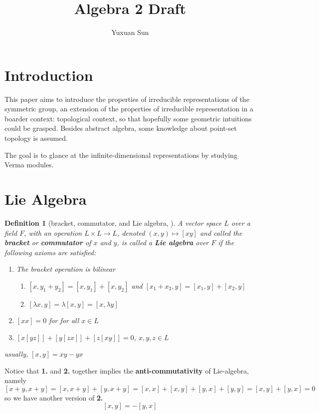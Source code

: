 \documentclass[a4paper]{article}
\title{Algebra 2 Draft}
\author{Yuxuan Sun}
\theoremstyle{theorem} %
\theoremstyle{bfnote}                  %
\newtheorem{defn}[thm]{Definition}
\theoremstyle{example}                       %
\theoremstyle{remark}                       %
\numberwithin{equation}{section}
\begin{document}
\maketitle

\section{Introduction}
This paper aims to introduce the properties of irreducible representations of the symmetric group, an extension of the properties of irreducible representation in a boarder context: topological context, so that hopefully some geometric intuitions could be grasped. Besides abstract algebra, some knowledge about point-set topology is assumed.

The goal is to glance at the infinite-dimensional representations by studying Verma modules.

\section{Lie Algebra}


\begin{defn}[bracket, commutator, and Lie algebra, \citep{Humph}]\label{defn:bracket}
	A vector space $L$ over a field $F$, with an operation $L \times L \to  L$, denoted $(x,y) \mapsto [xy]$ and called the  \textbf{bracket} or \textbf{commutator} of $x$ and  $y$, is called a  \textbf{Lie algebra} over $F$ if the following axioms are satisfied:

	 \begin{enumerate}
		 \item The bracket operation is bilinear
\begin{enumerate}
	\item $[x,y_1+y_2] = [x,y_1] + [x,y_2]$ and $[x_1+x_2,y] = [x_1,y] + [x_2,y]$
	\item $[\lambda x, y] = \lambda[x,y] = [x, \lambda y]$
\end{enumerate}
		 \item $[x x] = 0$ for for all  $x \in L$
		 \item $[x[yz]]+[y[zx]] +[z[xy]] = 0$,  $x,y,z \in L$
	\end{enumerate}
	usually, $[x,y] = xy - yx$	
\end{defn}

Notice that  \textbf{1.} and  \textbf{2.} together implies the \textbf{anti-commutativity} of Lie-algebra, namely \[
	[x+y, x+y] = [x, x+y] + [y, x+y] = [x,x]+[x,y] + [y,x]+[y,y] = [x,y] + [y,x] = 0
\]  so we have another version of \textbf{2.} \[
[x,y] = -[y,x]
\]  
\end{document}
